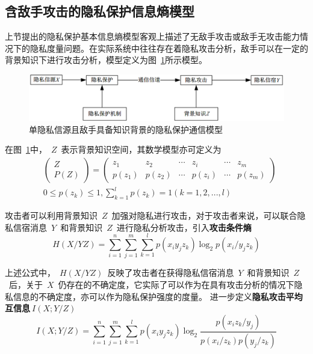 \subsection{含敌手攻击的隐私保护信息熵模型}\label{subsec:privacy-preserving-attack}

上节提出的隐私保护基本信息熵模型客观上描述了无敌手攻击或敌手无攻击能力情况下的隐私度量问题。在实际系统中往往存在着隐私攻击分析，敌手可以在一定的背景知识下进行攻击分析，模型定义为图~\ref{fig:Communication-Model-for-Privacy-of-Single}所示模型。
\begin{figure}[htbp]
	\centering
	\includegraphics[width = 0.95\linewidth]{./figures/Communication-Model-for-Privacy-of-Single.png}
	\caption{单隐私信源且敌手具备知识背景的隐私保护通信模型}
	\label{fig:Communication-Model-for-Privacy-of-Single}
\end{figure}

在图~\ref{fig:Communication-Model-for-Privacy-of-Single}中，~$Z$~表示背景知识空间，其数学模型亦可定义为
\begin{equation}
\begin{split}
&\begin{pmatrix}
Z\\ 
P(Z)
\end{pmatrix}=\begin{pmatrix}
z_{1} & z_{2} & \cdots  & z_{i} & \cdots  & z_{m}\\ 
p(z_{1})& p(z_{2}) & \cdots & p(z_{i}) & \cdots & p(z_{m})
\end{pmatrix} \\
&0 \leqslant p(z_{k})\leqslant 1,\sum_{k=1}^{l}p(z_{k})=1(k=1,2,...,l)
\end{split}
\end{equation}

攻击者可以利用背景知识~$Z$~加强对隐私进行攻击，对于攻击者来说，可以联合隐私信宿消息~$Y$~和背景知识~$Z$~进行隐私分析攻击，引入\textbf{攻击条件熵}
\begin{equation}
H(X/YZ)=\sum_{i=1}^{n}\sum_{j=1}^{m}\sum_{k=1}^{l}p(x_{i}y_{j}z_{k})\log_{2}p(x_{i}/y_{j}z_{k})
\end{equation}

上述公式中，~$H(X/YZ)$~反映了攻击者在获得隐私信宿消息~$Y$~和背景知识~$Z$~后，关于~$X$~仍存在的不确定度，它实际了可以作为在具有攻击分析的情况下隐私信息的不确定度，亦可以作为隐私保护强度的度量。
进一步定义\textbf{隐私攻击平均互信息}$~I(X;Y/Z)$~
\begin{equation}
I(X;Y/Z)=\sum_{i=1}^{n}\sum_{j=1}^{m}\sum_{k=1}^{l}p(x_{i}y_{j}z_{k})\log_{2}\frac{p(x_{i}z_{k}/y_{j})}{p(x_{i}/z_{k})p(y_{j}/z_{k})}
\end{equation}

